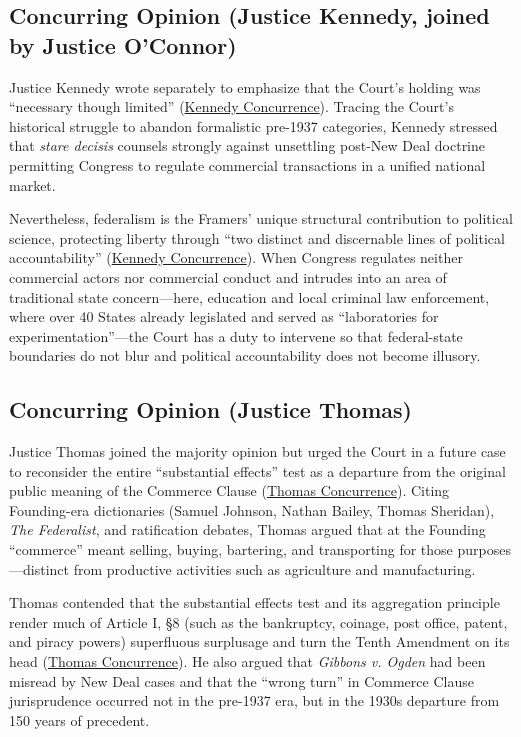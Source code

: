 \documentclass[12pt]{article}
\begin{document}
\subsection{Concurring Opinion (Justice Kennedy, joined by Justice O'Connor)}
Justice Kennedy wrote separately to emphasize that the Court's holding was ``necessary though limited'' (\href{https://www.law.cornell.edu/supct/html/93-1260.ZC.html}{Kennedy Concurrence}). Tracing the Court's historical struggle to abandon formalistic pre-1937 categories, Kennedy stressed that \textit{stare decisis} counsels strongly against unsettling post-New Deal doctrine permitting Congress to regulate commercial transactions in a unified national market.

Nevertheless, federalism is the Framers' unique structural contribution to political science, protecting liberty through ``two distinct and discernable lines of political accountability'' (\href{https://www.law.cornell.edu/supct/html/93-1260.ZC.html}{Kennedy Concurrence}). When Congress regulates neither commercial actors nor commercial conduct and intrudes into an area of traditional state concern---here, education and local criminal law enforcement, where over 40 States already legislated and served as ``laboratories for experimentation''---the Court has a duty to intervene so that federal-state boundaries do not blur and political accountability does not become illusory.

\subsection{Concurring Opinion (Justice Thomas)}
Justice Thomas joined the majority opinion but urged the Court in a future case to reconsider the entire ``substantial effects'' test as a departure from the original public meaning of the Commerce Clause (\href{https://www.law.cornell.edu/supct/html/93-1260.ZC1.html}{Thomas Concurrence}). Citing Founding-era dictionaries (Samuel Johnson, Nathan Bailey, Thomas Sheridan), \textit{The Federalist}, and ratification debates, Thomas argued that at the Founding ``commerce'' meant selling, buying, bartering, and transporting for those purposes---distinct from productive activities such as agriculture and manufacturing.

Thomas contended that the substantial effects test and its aggregation principle render much of Article I, \S 8 (such as the bankruptcy, coinage, post office, patent, and piracy powers) superfluous surplusage and turn the Tenth Amendment on its head (\href{https://www.law.cornell.edu/supct/html/93-1260.ZC1.html}{Thomas Concurrence}). He also argued that \textit{Gibbons v. Ogden} had been misread by New Deal cases and that the ``wrong turn'' in Commerce Clause jurisprudence occurred not in the pre-1937 era, but in the 1930s departure from 150 years of precedent.
\end{document}
